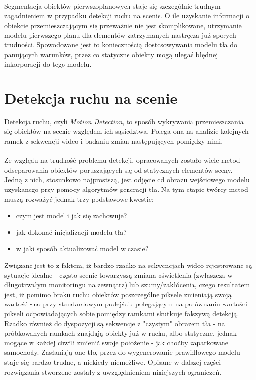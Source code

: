 \paragraph{}
Segmentacja obiektów pierwszoplanowych staje się szczególnie trudnym zagadnieniem w przypadku detekcji ruchu na scenie. O ile uzyskanie informacji o obiekcie przemieszczającym się przeważnie nie jest skomplikowane, utrzymanie modelu pierwszego planu dla elementów zatrzymanych nastręcza już sporych trudności. Spowodowane jest to koniecznością dostosowywania modelu tła do panujących warunków, przez co statyczne obiekty mogą ulegać błędnej inkorporacji do tego modelu.
\section{Detekcja ruchu na scenie}
Detekcja ruchu, czyli \textit{Motion Detection}, to sposób wykrywania przemieszczania się obiektów na scenie względem ich sąsiedztwa. Polega ona na analizie kolejnych ramek z sekwencji wideo i badaniu zmian następujących pomiędzy nimi.
\paragraph{}
Ze względu na trudność problemu detekcji, opracowanych zostało wiele metod odseparowania obiektów poruszających się od statycznych elementów sceny. Jedną z nich, stosunkowo najprostszą, jest odjęcie od obrazu wejściowego modelu uzyskanego przy pomocy algorytmów generacji tła. Na tym etapie twórcy metod muszą rozważyć jednak trzy podstawowe kwestie:
\begin{itemize}
\item czym jest model i jak się zachowuje?
\item jak dokonać inicjalizacji modelu tła?
\item w jaki sposób aktualizować model w czasie?
\end{itemize}
Związane jest to z faktem, iż bardzo rzadko na sekwencjach wideo rejestrowane są sytuacje idealne - często scenie towarzyszą zmiana oświetlenia (zwłaszcza w długotrwałym monitoringu na zewnątrz) lub szumy/zakłócenia, czego rezultatem jest, iż pomimo braku ruchu obiektów poszczególne piksele zmieniają swoją wartość - co przy standardowym podejściu polegającym na porównaniu wartości pikseli odpowiadających sobie pomiędzy ramkami skutkuje fałszywą detekcją. Rzadko również do dyspozycji są sekwencje z "czystym" obrazem tła - na próbkowanych ramkach znajdują obiekty już w ruchu, albo statyczne, jednak mogące w każdej chwili zmienić swoje położenie - jak choćby zaparkowane samochody. Zasłaniają one tło, przez do wygenerowanie prawidłowego modelu staje się bardzo trudne, a niekiedy niemożliwe. Opisane w dalszej części rozwiązania stworzone zostały z uwzględnieniem niniejszych ograniczeń.

